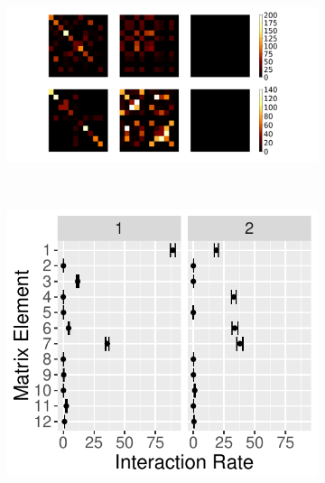 \documentclass{article}
\begin{document}
\begin{figure}
    \centering
    \begin{subfigure}[b]{0.28\textwidth}
        \includegraphics[width=\textwidth]{heatmap.pdf}
        \caption{}
        \label{fig:heatmap}
    \end{subfigure}
    ~ %
    \begin{subfigure}[b]{0.21\textwidth}
        \includegraphics[width=\textwidth]{SchoolRateMatrix.pdf}
        \caption{}
        \label{fig:SchoolRateMatrix}
    \end{subfigure}
    ~ %
    \begin{subfigure}[b]{0.21\textwidth}

\end{subfigure}
\end{figure}
\end{document}
